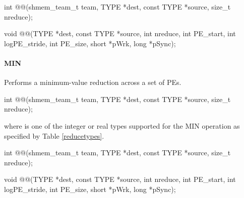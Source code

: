 \begin{apidefinition}
{\color{Green}
\begin{CsynopsisCol}
int @@(shmem_team_t team, TYPE *dest, const TYPE *source, size_t nreduce);
\end{CsynopsisCol}
}
\begin{DeprecateBlock}
\begin{CsynopsisCol}
void @@(TYPE *dest, const TYPE *source, int nreduce, int PE_start, int logPE_stride, int PE_size, short *pWrk, long *pSync);
\end{CsynopsisCol}
\end{DeprecateBlock}

\paragraph{MIN}
Performs a minimum-value reduction across a set of \acp{PE}.\newline

{\color{Green}
\begin{C11synopsis}
int @@(shmem_team_t team, TYPE *dest, const TYPE *source, size_t nreduce);
\end{C11synopsis}
where \TYPE{} is one of the integer or real types supported for the MIN operation as specified by Table \ref{reducetypes}.
}

\begin{Csynopsis}
\end{Csynopsis}

{\color{Green}
\begin{CsynopsisCol}
int @@(shmem_team_t team, TYPE *dest, const TYPE *source, size_t nreduce);
\end{CsynopsisCol}
}
\begin{DeprecateBlock}
\begin{CsynopsisCol}
void @@(TYPE *dest, const TYPE *source, int nreduce, int PE_start, int logPE_stride, int PE_size, short *pWrk, long *pSync);
\end{CsynopsisCol}
\end{DeprecateBlock}


\end{apidefinition}
